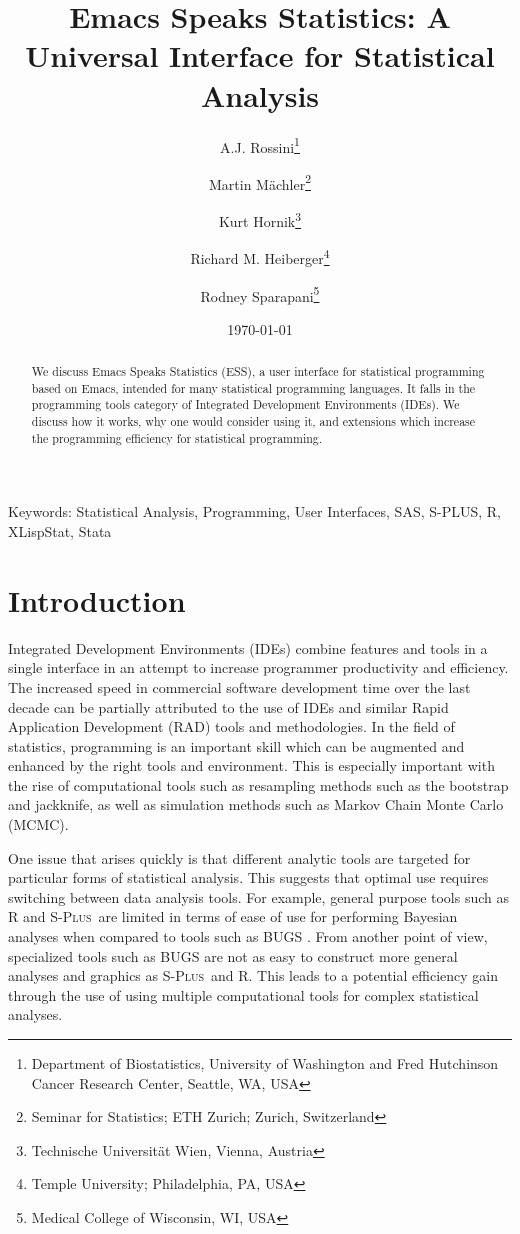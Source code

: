 \documentclass{article}
\title{Emacs Speaks Statistics: A Universal Interface for
  Statistical Analysis}
\author{A.J. Rossini\footnote{Department of Biostatistics, University
    of Washington and Fred Hutchinson Cancer Research Center, Seattle,
    WA, USA} \and Martin M{\"a}chler\footnote{Seminar for Statistics;
    ETH Zurich; Zurich, Switzerland} \and Kurt
  Hornik\footnote{Technische Universit{\"a}t Wien, Vienna, Austria}
  \and Richard M. Heiberger\footnote{Temple University; Philadelphia,
    PA, USA} \and Rodney Sparapani\footnote{Medical College of
    Wisconsin, WI, USA}}
\date{\today}
\newif\ifpdf
\newcommand*{\Splus}{\textsc{S-Plus}}
\begin{document}
\ifpdf
  \DeclareGraphicsExtensions{.jpg,.pdf,.png,.mps}
\fi


\maketitle

Keywords: Statistical Analysis, Programming, User Interfaces, SAS,
S-PLUS, R, XLispStat, Stata

\begin{abstract}
  We discuss Emacs Speaks Statistics (ESS), a user interface for
  statistical programming based on Emacs, intended for many
  statistical programming languages.  It falls in the programming
  tools category of Integrated Development Environments (IDEs).  We
  discuss how it works, why one would consider using it, and
  extensions which increase the programming efficiency for statistical
  programming.
\end{abstract}

\section{Introduction}
\label{sec:intro}

Integrated Development Environments (IDEs) combine features and tools
in a single interface in an attempt to increase programmer
productivity and efficiency.  The increased speed in commercial
software development time over the last decade can be partially
attributed to the use of IDEs and similar Rapid Application
Development (RAD) tools and methodologies.  In the field of
statistics, programming is an important skill which can be augmented
and enhanced by the right tools and environment.  This is especially
important with the rise of computational tools such as resampling
methods such as the bootstrap and jackknife, as well as simulation
methods such as Markov Chain Monte Carlo (MCMC).

One issue that arises quickly is that different analytic tools are
targeted for particular forms of statistical analysis.  This suggests
that optimal use requires switching between data analysis tools.  For
example, general purpose tools such as R \citep{ihak:gent:1996} and
\Splus\ are limited in terms of ease of use for performing Bayesian
analyses when compared to tools such as BUGS
\citep{SpieThomBest:1999}.  From another point of view, specialized
tools such as BUGS are not as easy to construct more general analyses
and graphics as \Splus\ and R.  This leads to a potential efficiency
gain through the use of using multiple computational tools for complex
statistical analyses.
\end{document}
